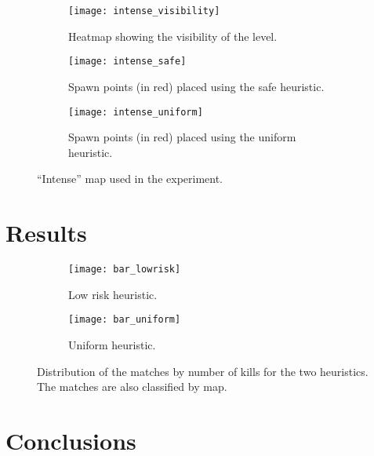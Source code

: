 \begin{figure}[tp]
	\centering  	
  	\begin{subfigure}[t]{0.3\linewidth}
    		\texttt{[image: intense\_visibility]}
     		\caption{Heatmap showing the visibility of the level.}
		\label{img:intense_visibility}
  	\end{subfigure}  	
  	\hfil
  	\begin{subfigure}[t]{0.3\linewidth}
    		\texttt{[image: intense\_safe]}
     		\caption{Spawn points (in red) placed using the safe heuristic.}
     		\label{img:intense_safe}
  	\end{subfigure}
  	\hfil
  	\begin{subfigure}[t]{0.3\linewidth}
    		\texttt{[image: intense\_uniform]}
     		\caption{Spawn points (in red) placed using the uniform heuristic.}
		\label{img:intense_uniform}
  	\end{subfigure}
	\caption{``Intense'' map used in the experiment.}
	\label{img:intense}	
\end{figure}


\section{Results}

\begin{figure}[tp]
	\centering  	
  	\begin{subfigure}[t]{0.48\linewidth}
    		\texttt{[image: bar\_lowrisk]}
     		\caption{Low risk heuristic.}
		\label{img:bar_lowrisk}
  	\end{subfigure}  	
  	\hfil
  	\begin{subfigure}[t]{0.48\linewidth}
    		\texttt{[image: bar\_uniform]}
     		\caption{Uniform heuristic.}
     		\label{img:bar_uniform}
  	\end{subfigure}
	\caption[Distribution of the matches by number of kills for the two heuristics.]{Distribution of the matches by number of kills for the two heuristics. The matches are also classified by map.}
	\label{img:intense}	
\end{figure}


\section{Conclusions}

